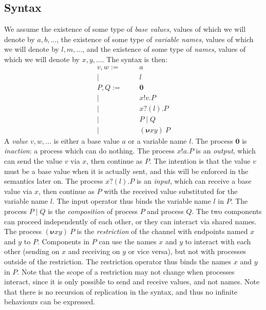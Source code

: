 \documentclass[a4paper]{article}
\newcommand{\Pend}{\bm{0}}
\newcommand{\Ppar}[2]{#1 \mid #2}
\newcommand{\Pout}[3]{#1 ! #2 . #3}
\newcommand{\Pin}[3]{#1 ? (#2) . #3}
\newcommand{\Presd}[3]{(\bm{\nu} #1#2)~#3}
\begin{document}
\subsection{Syntax}
We assume the existence of some type of \emph{base values}, values of which we will denote by \( a, b, \dots \), the existence of some type of \emph{variable names}, values of which we will denote by \( l, m, \dots \), and the existence of some type of \emph{names}, values of which we will denote by \( x, y, \dots \).
The syntax is then:
\begin{align*}
  v,w :=&&& a \\
  |&&& l \\
  P,Q :=&&& \Pend \\
  |&&& \Pout{x}{v}{P} \\
  |&&& \Pin{x}{l}{P} \\
  |&&& \Ppar{P}{Q} \\
  |&&& \Presd{x}{y}{P}
\end{align*}
A \emph{value} \( v, w, \dots \) is either a base value \( a \) or a variable name \( l \).
The process \( \Pend \) is \emph{inaction}: a process which can do nothing.
The process \( \Pout{x}{a}{P} \) is an \emph{output}, which can send the value \( v \) via \( x \), then continue as \( P \).
The intention is that the value \( v \) must be a base value when it is actually sent, and this will be enforced in the semantics later on.
The process \( \Pin{x}{l}{P} \) is an \emph{input}, which can receive a base value via \( x \), then continue as \( P \) with the received value substituted for the variable name \( l \).
The input operator thus binds the variable name \( l \) in \( P \).
The process \( \Ppar{P}{Q} \) is the \emph{composition} of process \( P \) and process \( Q \).
The two components can proceed independently of each other, or they can interact via shared names.
The process \( \Presd{x}{y}{P} \) is the \emph{restriction} of the channel with endpoints named \( x \) and \( y \) to \( P \).
Components in \( P \) can use the names \( x \) and \( y \) to interact with each other (sending on \( x \) and receiving on \( y \) or vice versa), but not with processes outside of the restriction.
The restriction operator thus binds the names \( x \) and \( y \) in \( P \).
Note that the scope of a restriction may not change when processes interact, since it is only possible to send and receive values, and not names.
Note that there is no recursion of replication in the syntax, and thus no infinite behaviours can be expressed.
\end{document}
